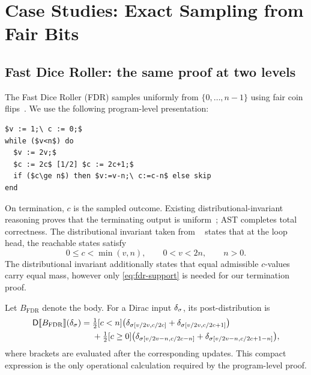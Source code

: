\section{Case Studies: Exact Sampling from Fair Bits}
\label{sec:case-studies}

\subsection{Fast Dice Roller: the same proof at two levels}
\label{sec:fdr}

The Fast Dice Roller (FDR) samples uniformly from $\{0,\ldots,n-1\}$ using fair coin flips~\cite{DBLP:journals/corr/abs-1304-1916}. We use the following program-level presentation:
\begin{lstlisting}[basicstyle=\ttfamily\small,mathescape=true,frame=single]
$v := 1;\ c := 0;$
while ($v<n$) do
  $v := 2v;$
  $c := 2c$ [1/2] $c := 2c+1;$
  if ($c\ge n$) then $v:=v-n;\ c:=c-n$ else skip
end
\end{lstlisting}
On termination, $c$ is the sampled outcome. Existing distributional-invariant reasoning proves that the terminating output is uniform~\cite{zilken2026verifyingsamplingalgorithmsdistributional}; AST completes total correctness. The distributional invariant taken from ~\cite{zilken2026verifyingsamplingalgorithmsdistributional} states that at the loop head, the reachable states satisfy
\begin{equation}
 0\le c<\min(v,n),\qquad 0<v<2n,\qquad n>0.
 \label{eq:fdr-support}
\end{equation}
The distributional invariant additionally states that equal admissible $c$-values carry equal mass, however only \eqref{eq:fdr-support} is needed for our termination proof.

Let $B_{\mathrm{FDR}}$ denote the body. For a Dirac input $\delta_{\sigma}$, its post-distribution is
\begin{align}
\mathsf{D}\llbracket B_{\mathrm{FDR}}\rrbracket(\delta_{\sigma})
={}&\tfrac12[c<n]\bigl(
 \delta_{\sigma[v/2v,c/2c]}+\delta_{\sigma[v/2v,c/2c+1]}\bigr)\notag\\
&+\tfrac12[c\geq0]\bigl(
 \delta_{\sigma[v/2v-n,c/2c-n]}+
 \delta_{\sigma[v/2v-n,c/2c+1-n]}\bigr),
\label{eq:fdr-post}
\end{align}
where brackets are evaluated after the corresponding updates. This compact expression is the only operational calculation required by the program-level proof.

